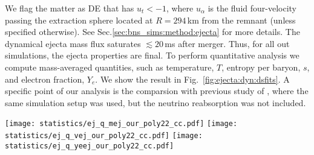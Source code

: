 We flag the matter as \ac{DE} that has $u_t < -1$, where $u_{\alpha}$ is the 
fluid four-velocity passing the extraction sphere located at $R=294\,$km 
from the remnant (unless specified otherwise).
See Sec.\ref{sec:bns_sims:method:ejecta} for more details.
%
The dynamical ejecta mass flux saturates ${\lesssim}20\,$ms after merger.
Thus, for all out simulations, the ejecta properties are final.
%
To perform quantitative analysis we compute mass-averaged quantities, such 
as temperature, $T$, entropy per baryon, $s$, and electron fraction, $Y_e$.
We show the result in Fig.~\ref{fig:ejecta:dyn:dsfits}.
A specific point of our analysis is the comparsion with previous study of 
\citet{Radice:2018pdn}, where the same simulation setup was used, but 
the neutrino reabsorption was not included.
%
\begin{figure*}[t]
    \centering 
    \texttt{[image: statistics/ej\_q\_mej\_our\_poly22\_cc.pdf]}
    \texttt{[image: statistics/ej\_q\_vej\_our\_poly22\_cc.pdf]}
    \texttt{[image: statistics/ej\_q\_yeej\_our\_poly22\_cc.pdf]}
    \caption{Dynamical ejecta properties as a function of mass ratio
        and reduced tidal parameter. The dependency on the latter is
        color coded. From left to right the main panels show the total
        mass, the mass-averaged velocity and the electron fraction.
        The bottom panels show the relative difference between the data
        and the fit polynomial fit discussed in the text.
        (Adapted from \citet{Nedora:2020pak})
    }
    \label{fig:ejecta:dyn:dsfits}
\end{figure*}
%




